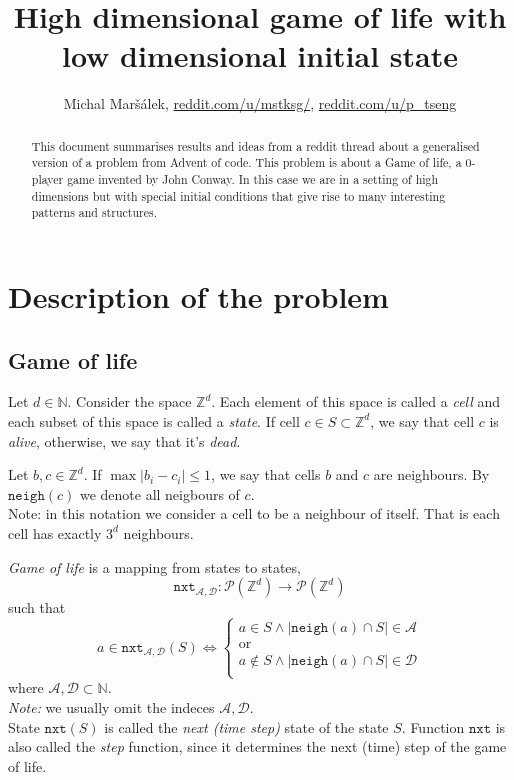 \documentclass[]{article}
\title{High dimensional game of life with low dimensional initial state}
\author{Michal Maršálek, \href{https://www.reddit.com/u/mstksg/}{reddit.com/u/mstksg/}, \href{https://www.reddit.com/u/p\_tseng/}{reddit.com/u/p\_tseng}}
\newcommand{\NN}{\mathbb N}
\newcommand{\ZZ}{\mathbb Z}
\newcommand{\calP}{\mathcal P}
\newcommand{\calA}{\mathcal A}
\newcommand{\calD}{\mathcal D}
\newcommand{\nxt}{\texttt{nxt}}
\newcommand{\neigh}{\texttt{neigh}}
\begin{document}
	
	\maketitle
	
	\begin{abstract}
		This document summarises results and ideas from a reddit thread about a generalised version of a problem from Advent of code. This problem is about a Game of life, a 0-player game invented by John Conway. In this case we are in a setting of high dimensions but with special initial conditions that give rise to many interesting patterns and structures.
	\end{abstract}
\newpage
	
	\section{Description of the problem}
	
	\subsection{Game of life}
	
	Let $d\in\NN$. Consider the space $\ZZ ^d$. Each element of this space is called a \emph{cell} and each subset of this space is called a \emph{state}. If cell $c \in S \subset \ZZ^d$, we say that cell $c$ is \emph{alive}, otherwise, we say that it's \emph{dead}.
	
	Let $b,c \in \ZZ^d$. If $\max |b_i - c_i| \leq 1$, we say that cells $b$ and $c$ are neighbours. By $\neigh(c)$ we denote all neigbours of $c$.\\
	Note: in this notation we consider a cell to be a neighbour of itself. That is each cell has exactly $3^d$ neighbours.
	
	\emph{Game of life} is a mapping from states to states,
	$$\nxt_{\calA, \calD}: \calP(\ZZ^d) \to \calP(\ZZ^d)$$
	such that
	$$a \in \nxt_{\calA, \calD}(S) \iff \begin{cases}
	a \in S \land |\neigh(a) \cap S| \in \calA\\
	\text{or}\\
	a \not\in S \land |\neigh(a) \cap S| \in \calD\\
	\end{cases}
	$$
	where $\calA, \calD \subset \NN$.\\
	\emph{Note:} we usually omit the indeces $\calA, \calD$.\\
	State $\nxt(S)$ is called the \emph{next (time step)} state of the state $S$. Function $\nxt$ is also called the \emph{step} function, since it determines the next (time) step of the game of life.
	
\end{document}
